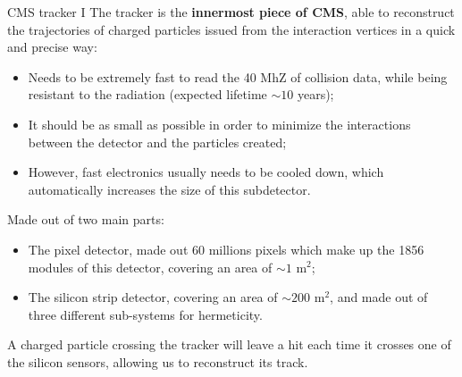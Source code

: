 \documentclass[8pt]{beamer}
\begin{document}
\begin{frame}{CMS tracker I}
\justifying
The tracker is the \textbf{innermost piece of CMS}, able to reconstruct the trajectories of charged particles issued from the interaction vertices in a quick and precise way:
\begin{itemize}
\justifying
\item Needs to be extremely fast to read the 40 MhZ of collision data, while being resistant to the radiation (expected lifetime $\sim 10$ years);
\item It should be as small as possible in order to minimize the interactions between the detector and the particles created;
\item However, fast electronics usually needs to be cooled down, which automatically increases the size of this subdetector.
\end{itemize} \vfill

Made out of two main parts: 
\begin{itemize}
\justifying
\item The \alert{pixel detector}, made out 60 millions pixels which make up the 1856 modules of this detector, covering an area of $\sim 1$ m$^2$;
\item The \alert{silicon strip detector}, covering an area of $\sim 200$ m$^2$, and made out of three different sub-systems for hermeticity.
\end{itemize} \vfill

A charged particle crossing the tracker will leave a hit each time it crosses one of the silicon sensors, allowing us to reconstruct its track. \vfill
\end{frame}
\end{document}
